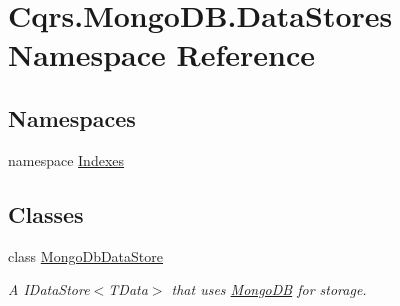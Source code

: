 \hypertarget{namespaceCqrs_1_1MongoDB_1_1DataStores}{}\section{Cqrs.\+Mongo\+D\+B.\+Data\+Stores Namespace Reference}
\label{namespaceCqrs_1_1MongoDB_1_1DataStores}
\subsection*{Namespaces}
\begin{DoxyCompactItemize}
\item 
namespace \hyperlink{namespaceCqrs_1_1MongoDB_1_1DataStores_1_1Indexes}{Indexes}
\end{DoxyCompactItemize}
\subsection*{Classes}
\begin{DoxyCompactItemize}
\item 
class \hyperlink{classCqrs_1_1MongoDB_1_1DataStores_1_1MongoDbDataStore}{Mongo\+Db\+Data\+Store}
\begin{DoxyCompactList}\small\item\em A I\+Data\+Store$<$\+T\+Data$>$ that uses \hyperlink{namespaceCqrs_1_1MongoDB}{Mongo\+DB} for storage. \end{DoxyCompactList}\end{DoxyCompactItemize}
